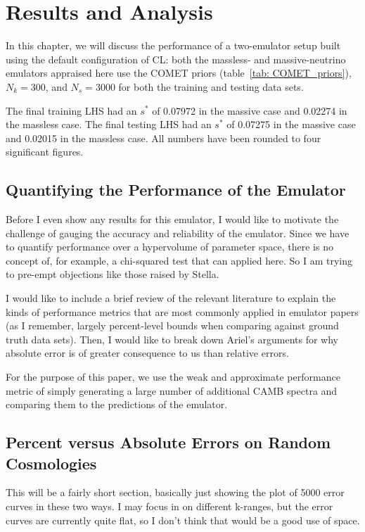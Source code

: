 \chapter{Results and Analysis}

In this chapter, we will discuss the performance of a two-emulator setup
built using the default configuration of CL: both the massless- and
massive-neutrino emulators appraised here use the COMET priors
(table~\ref{tab: COMET_priors}), $N_k = 300$, and $N_s = 3000$ for both the
training and testing data sets.

The final training LHS had an $s^*$ of 0.07972 in the massive case and 
0.02274 in the massless case. The final testing LHS had an $s^*$ of 0.07275 in 
the massive case and 0.02015 in the massless case. All numbers have been 
rounded to four significant figures.

\section{Quantifying the Performance of the Emulator}

Before I even show any results for this emulator, I would like to motivate the 
challenge of gauging the accuracy and reliability of the emulator. Since we 
have to quantify performance over a hypervolume of parameter space, there is 
no concept of, for example, a chi-squared test that can applied here. So I am 
trying to pre-empt objections like those raised by Stella.

I would like to include a brief review of the relevant literature to explain 
the kinds of performance metrics that are most commonly applied in emulator 
papers (as I remember, largely percent-level bounds when comparing against 
ground truth data sets). Then, I would like to break down Ariel's arguments 
for why absolute error is of greater consequence to us than relative errors.

For the purpose of this paper, we use the weak and approximate performance 
metric of simply generating a large number of additional CAMB spectra and 
comparing them to the predictions of the emulator.

\section{Percent versus Absolute Errors on Random Cosmologies}

This will be a fairly short section, basically just showing the plot of 5000 
error curves in these two ways. I may focus in on different k-ranges, but the 
error curves are currently quite flat, so I don't think that would be a good 
use of space.


